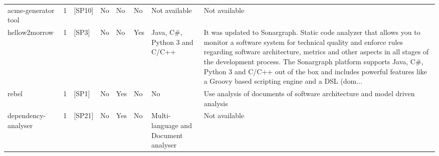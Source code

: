 \begin{tabular}{lrllllll}
 acme-generator tool &      1 &                                                 [SP10] &    No &       No &        No &                                                                                                                                                                           Not available &                                                                                                                                                                                                                                                                                                                                                                                                    Not available \\
       hellow2morrow &      1 &                                                  [SP3] &    No &       No &       Yes &                                                                                                                                                            Java, C\#, Python 3 and C/C++ &  It was updated to Sonargraph. Static code analyzer that allows you to monitor a software system for technical quality and enforce rules regarding software architecture, metrics and other aspects in all stages of the development process. The Sonargraph platform supports Java, C\#, Python 3 and C/C++ out of the box and includes powerful features like a Groovy based scripting engine and a DSL (dom... \\
               rebel &      1 &                                                  [SP1] &    No &      Yes &        No &                                                                                                                                                                                      No &                                                                                                                                                                                                                                                                                                                                     Use analysis of documents of software architecture and model driven analysis \\
 dependency-analyser &      1 &                                                 [SP21] &    No &      Yes &        No &                                                                                                                                                    Multi-language and Document analyser &                                                                                                                                                                                                                                                                                                                                                                                                    Not available \\

\end{tabular}
